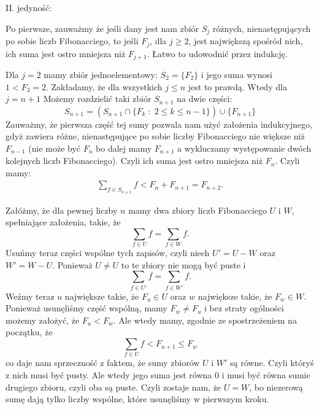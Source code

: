 \documentclass{article}[13pt]
\begin{document}
    II. jedyność:
    \medskip

    Po pierwsze, zauważmy że jeśli dany jest nam zbiór $S_j$ różnych, nienastępujących po sobie liczb Fibonacciego, to jeśli $F_j$, dla $j\geq 2$, jest największą spośród nich, ich suma jest ostro mniejsza niż $F_{j+1}$. Łatwo to udowodnić przez indukcję.
    \smallskip
    
    Dla $j=2$ mamy zbiór jednoelementowy: $S_2=\{F_2\}$ i jego suma wynosi $1<F_3=2$. Zakładamy, że dla wszystkich $j\leq n$ jest to prawdą. Wtedy dla $j=n+1$ Możemy rozdzielić taki zbiór $S_{n+1}$ na dwie części:
    $$S_{n+1}=(S_{n+1}\cap\{F_k\;:\;2\leq k\leq n-1\})\cup\{F_{n+1}\}$$
    Zauważmy, że pierwsza część tej sumy pozwala nam użyć założenia indukcyjnego, gdyż zawiera różne, nienastępujące po sobie liczby Fibonacciego nie większe niż $F_{n-1}$ (nie może być $F_n$ bo dalej mamy $F_{n+1}$ a wykluczamy występowanie dwóch kolejnych liczb Fibonacciego). Czyli ich suma jest ostro mniejsza niż $F_{n}$. Czyli mamy:
    \begin{align*}
        \sum\limits_{f\in S_{n+1}}f<F_n+F_{n+1}=F_{n+2}.
    \end{align*}

    Załóżmy, że dla pewnej liczby $n$ mamy dwa zbiory liczb Fibonacciego $U$ i $W$, spełniające założenia, takie, że
    $$\sum\limits_{f\in U}f=\sum\limits_{f\in W}f.$$
    Usuńmy teraz części wspólne tych zapisów, czyli niech $U'=U-W$ oraz $W'=W-U$. Ponieważ $U\neq U$ to te zbiory nie mogą być puste i 
    $$\sum\limits_{f\in U'}f=\sum\limits_{f\in W'}f.$$
    Weźmy teraz $u$ największe takie, że $F_u\in U$ oraz $w$ największe takie, że $F_w\in W$. Ponieważ usunęliśmy część wspólną, mamy $F_w\neq F_u$ i bez straty ogólności możemy założyć, że $F_u<F_w$. Ale wtedy mamy, zgodnie ze spostrzeżeniem na początku, że
    $$\sum\limits_{f\in U}f<F_{u+1}\leq F_w$$
    co daje nam sprzeczność z faktem, że sumy zbiorów $U$ i $W'$ są równe. Czyli któryś z nich musi być pusty. Ale wtedy jego suma jest równa 0 i musi być równa sumie drugiego zbioru, czyli oba są puste. Czyli zostaje nam, że $U=W$, bo niezerową sumę dają tylko liczby wspólne, które usunęliśmy w pierwszym kroku.
\end{document}
